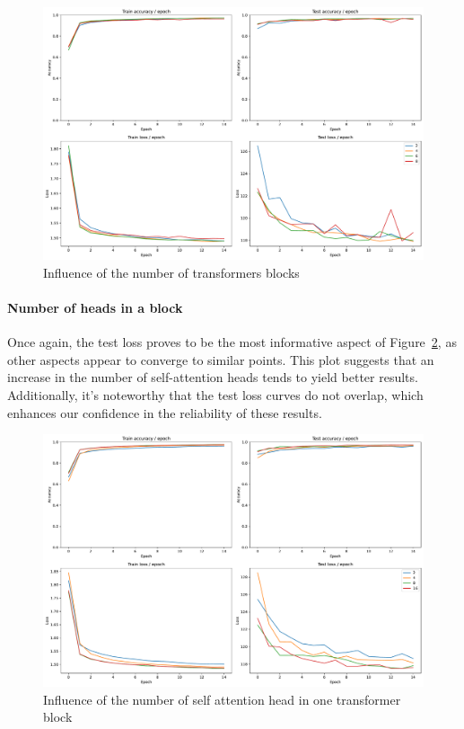 \begin{figure}[H]
    \centering
    \includegraphics*[width=\textwidth]{figs/Transformers/nb_block_influence.pdf}
    \caption{Influence of the number of transformers blocks}
    \label{fig:nb_block_influence}
\end{figure}

\paragraph{Number of heads in a block}
Once again, the test loss proves to be the most informative aspect of Figure~\ref{fig:num_heads_influence}, as other aspects appear to converge to similar points. This plot suggests that an increase in the number of self-attention heads tends to yield better results. Additionally, it's noteworthy that the test loss curves do not overlap, which enhances our confidence in the reliability of these results.

\begin{figure}[H]
    \centering
    \includegraphics*[width=\textwidth]{figs/Transformers/num_heads_influence.pdf}
    \caption{Influence of the number of self attention head in one transformer block }
    \label{fig:num_heads_influence}
\end{figure}

